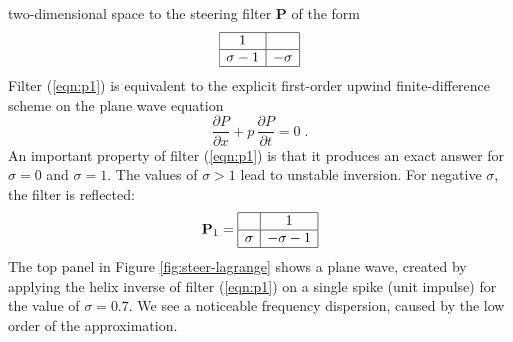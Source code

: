 two-dimensional space to the steering filter $\mathbf{P}$ of the
form
\begin{equation}
  \label{eqn:p1}
  \begin{array}{|c|c|}
    \hline
    1 & \\ \hline
    \sigma-1 & -\sigma \\ \hline
  \end{array}
\end{equation}
Filter (\ref{eqn:p1}) is equivalent to the explicit first-order upwind
finite-difference scheme on the plane wave equation
\begin{equation}
  {\frac{\partial P}{\partial x}} + p\,{\frac{\partial P}{\partial t}} = 0\;.
  \label{eqn:wave}
\end{equation}
An important property of filter (\ref{eqn:p1}) is that it produces an
exact answer for $\sigma=0$ and $\sigma=1$. The values of $\sigma > 1$
lead to unstable inversion. For negative $\sigma$, the filter is 
reflected:
\begin{equation}
  \label{eqn:p1p}
  \mathbf{P}_1 =
  \begin{array}{|c|c|}
    \hline
     & 1 \\ \hline
    \sigma & -\sigma - 1 \\ \hline
  \end{array}
\end{equation}
The top panel in Figure \ref{fig:steer-lagrange} shows a plane wave, created
by applying the helix inverse of filter (\ref{eqn:p1}) on a single
spike (unit impulse) for the value of $\sigma=0.7$. We see a
noticeable frequency dispersion, caused by the low order of the
approximation.

